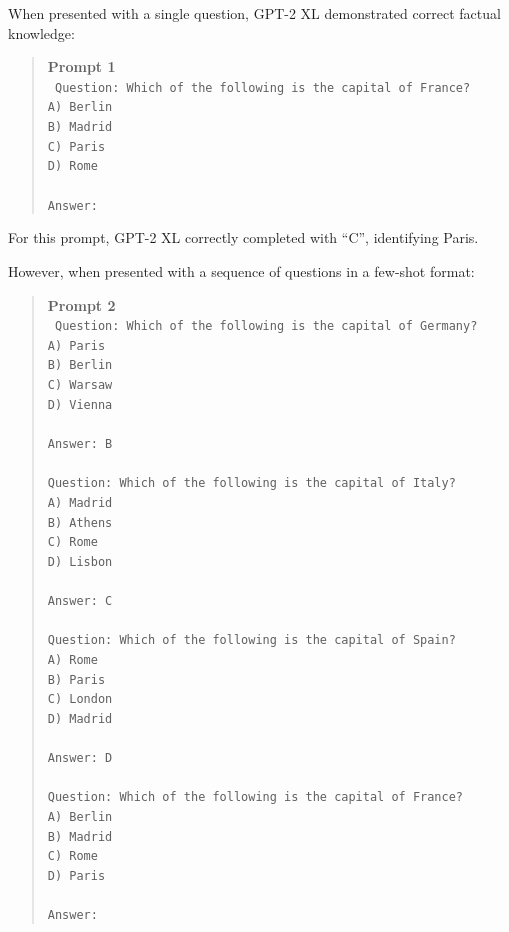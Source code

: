\documentclass[10pt]{article}
\begin{document}
When presented with a single question, GPT-2 XL demonstrated correct factual knowledge:

\begin{quote}
\textbf{Prompt 1}\\[0.5em]
\texttt{
Question: Which of the following is the capital of France?\\
A) Berlin\\
B) Madrid\\
C) Paris\\
D) Rome\\
\\
Answer:
}
\end{quote}

For this prompt, GPT-2 XL correctly completed with ``C'', identifying Paris.

However, when presented with a sequence of questions in a few-shot format:

\begin{quote}
\textbf{Prompt 2}\\[0.5em]
\texttt{
Question: Which of the following is the capital of Germany?\\
A) Paris\\
B) Berlin\\
C) Warsaw\\
D) Vienna\\
\\
Answer: B\\
\\
Question: Which of the following is the capital of Italy?\\
A) Madrid\\
B) Athens\\
C) Rome\\
D) Lisbon\\
\\
Answer: C\\
\\
Question: Which of the following is the capital of Spain?\\
A) Rome\\
B) Paris\\
C) London\\
D) Madrid\\
\\
Answer: D\\
\\
Question: Which of the following is the capital of France?\\
A) Berlin\\
B) Madrid\\
C) Rome\\
D) Paris\\
\\
Answer:
}
\end{quote}
\end{document}
